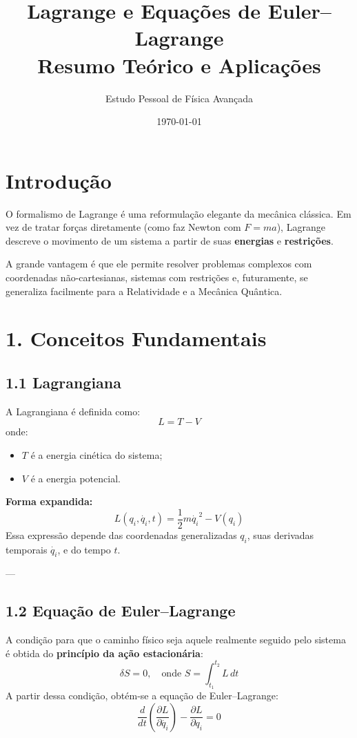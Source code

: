 \documentclass[a4paper,12pt]{article}
\title{Lagrange e Equações de Euler–Lagrange \\ \small{Resumo Teórico e Aplicações}}
\author{Estudo Pessoal de Física Avançada}
\date{\today}
\begin{document}
\maketitle

\section*{Introdução}
O formalismo de Lagrange é uma reformulação elegante da mecânica clássica.
Em vez de tratar forças diretamente (como faz Newton com $F = ma$), 
Lagrange descreve o movimento de um sistema a partir de suas \textbf{energias} e \textbf{restrições}.

A grande vantagem é que ele permite resolver problemas complexos com coordenadas não-cartesianas,
sistemas com restrições e, futuramente, se generaliza facilmente para a Relatividade e a Mecânica Quântica.

\section*{1. Conceitos Fundamentais}

\subsection*{1.1 Lagrangiana}
A Lagrangiana é definida como:
\[
L = T - V
\]
onde:
\begin{itemize}
    \item $T$ é a energia cinética do sistema;
    \item $V$ é a energia potencial.
\end{itemize}

\noindent
\textbf{Forma expandida:}
\[
L(q_i, \dot{q_i}, t) = \frac{1}{2} m \dot{q_i}^2 - V(q_i)
\]
Essa expressão depende das coordenadas generalizadas $q_i$, suas derivadas temporais $\dot{q_i}$, e do tempo $t$.

---

\subsection*{1.2 Equação de Euler–Lagrange}
A condição para que o caminho físico seja aquele realmente seguido pelo sistema é obtida do \textbf{princípio da ação estacionária}:
\[
\delta S = 0, \quad \text{onde } S = \int_{t_1}^{t_2} L \, dt
\]
A partir dessa condição, obtém-se a equação de Euler–Lagrange:
\[
\frac{d}{dt}\left( \frac{\partial L}{\partial \dot{q_i}} \right) - \frac{\partial L}{\partial q_i} = 0
\]
\end{document}
